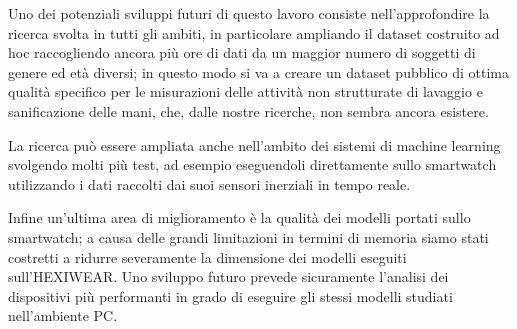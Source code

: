 Uno dei potenziali sviluppi futuri di questo lavoro consiste nell'approfondire la ricerca svolta in tutti gli ambiti, in particolare ampliando il dataset costruito ad hoc raccogliendo ancora più ore di dati da un maggior numero di soggetti di genere ed età diversi; in questo modo si va a creare un dataset pubblico di ottima qualità specifico per le misurazioni delle attività non strutturate di lavaggio e sanificazione delle mani, che, dalle nostre ricerche, non sembra ancora esistere.

La ricerca può essere ampliata anche nell'ambito dei sistemi di machine learning svolgendo molti più test, ad esempio eseguendoli direttamente sullo smartwatch utilizzando i dati raccolti dai suoi sensori inerziali in tempo reale. 

Infine un’ultima area di miglioramento è la qualità dei modelli portati sullo smartwatch; a causa delle grandi limitazioni in termini di memoria siamo stati costretti a ridurre severamente la dimensione dei modelli eseguiti sull'HEXIWEAR. Uno sviluppo futuro prevede sicuramente l’analisi dei dispositivi più performanti in grado di eseguire gli stessi modelli studiati nell’ambiente PC.